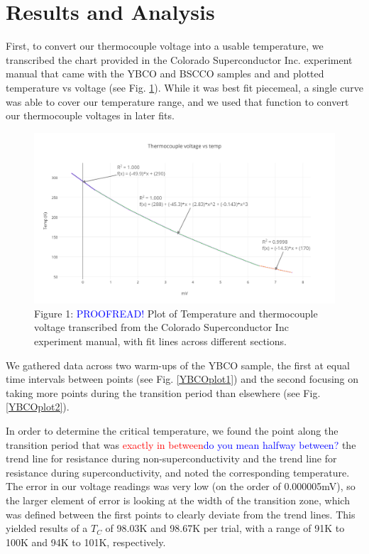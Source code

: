 \documentclass[prb,preprint]{revtex4-1}
\begin{document}
\section{Results and Analysis}

First, to convert our thermocouple voltage into a usable temperature, we transcribed the chart provided in the Colorado Superconductor Inc. experiment manual that came with the YBCO and BSCCO samples and and plotted temperature vs voltage (see Fig. \ref{TCplot}). While it was best fit piecemeal, a single curve was able to cover our temperature range, and we used that function to convert our thermocouple voltages in later fits.

\begin{figure}[h!]
\centering
\includegraphics[width=7in]{thermocouple_voltage_vs_temp.png}
\caption{Figure 1: \textcolor{blue}{PROOFREAD!} Plot of Temperature and thermocouple voltage transcribed from the Colorado Superconductor Inc experiment manual, with fit lines across different sections.}
\label{TCplot}
\end{figure}

We gathered data across two warm-ups of the YBCO sample, the first at equal time intervals between points (see Fig. \ref{YBCOplot1}) and the second focusing on taking more points during the transition period than elsewhere (see Fig. \ref{YBCOplot2}). 

In order to determine the critical temperature, we found the point along the transition period that was \textcolor{red}{exactly in between}\textcolor{blue}{do you mean halfway between?} the trend line for resistance during non-superconductivity and the trend line for resistance during superconductivity, and noted the corresponding temperature. The error in our voltage readings was very low (on the order of 0.000005mV), so the larger element of error is looking at the width of the transition zone, which was defined between the first points to clearly deviate from the trend lines. This yielded results of a $T_C$ of 98.03K and 98.67K per trial, with a range of 91K to 100K and 94K to 101K, respectively.
\end{document}
